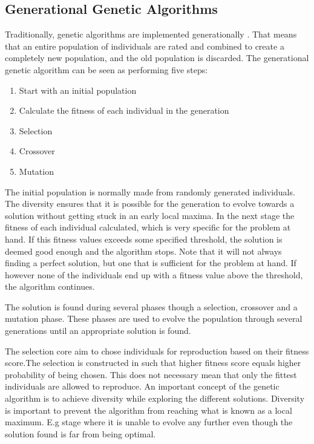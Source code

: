 
\subsection{Generational Genetic Algorithms}

Traditionally, genetic algorithms are implemented generationally . That means that an entire population of individuals are rated and combined to create a completely new population, and the old population is discarded. The generational genetic algorithm can be seen as performing five steps:


\begin{enumerate}
    \item Start with an initial population
    \item Calculate the fitness of each individual in the generation
    \item Selection
    \item Crossover
    \item Mutation  
\end{enumerate}

The initial population is normally made from randomly generated individuals.
The diversity ensures that it is possible for the generation to evolve towards a solution without getting stuck in an early local maxima.
In the next stage the fitness of each individual calculated, which is very specific for the problem at hand.
If this fitness values exceeds some specified threshold, the solution is deemed good enough and the algorithm stops.
Note that it will not always finding a perfect solution, but one that is sufficient for the problem at hand.
If however none of the individuals end up with a fitness value above the threshold, the algorithm continues.

The solution is found during several phases though a selection, crossover and a mutation phase. 
These phases are used to evolve the population through several generations until an appropriate solution is found. 

The selection core aim to chose individuals for reproduction based on their fitness score.The selection is constructed in such that higher fitness score equals higher probability of being chosen. This does not necessary mean that only the fittest individuals are allowed to reproduce. An important concept of the genetic algorithm is to achieve diversity while exploring the different solutions. Diversity is important to prevent the algorithm from reaching what is known as a local maximum. E.g stage where it is unable to evolve any further even though the solution found is far from being optimal.

